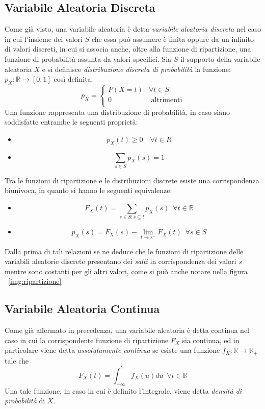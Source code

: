 \documentclass[a4paper,12pt, oneside]{book}
\newcommand{\numberset}{\mathbb}
\newcommand{\R}{\numberset{R}}
\begin{document}
\subsection{Variabile Aleatoria Discreta}
Come già visto, una variabile aleatoria è detta \emph{variabile aleatoria discreta} nel caso in cui l'insieme dei valori $S$
che essa può assumere  è finita oppure da un infinito di valori discreti, in cui si associa anche, oltre alla
funzione di ripartizione, una funzione di probabilità assunta da valori specifici.\newline
Sia $S$ il supporto della variabile aleatoria $X$ e si definisce \emph{distribuzione discreta di probabilità} la funzione:
$p_X:\R \to [0,1]$ così definita:
\[
    p_X = \begin{cases}
            P(X = t)& \forall t \in S\\
            0& \mbox{ altrimenti}\\
          \end{cases}\]
Una funzione rappresenta una distribuzione di probabilità, in caso siano soddisfatte entrambe le seguenti proprietà:
\begin{itemize}
    \item \[ p_X(t) \geq 0 \quad \forall t \in R \]
    \item \[ \sum _{s \in S} p_X(s) = 1 \]
\end{itemize}
Tra le funzioni di ripartizione e le distribuzioni discrete esiste una corrispondenza biunivoca, in quanto
si hanno le seguenti equivalenze:
\begin{itemize}
    \item \[F_X(t) = \sum _{s \in S:s \subseteq t} p_X(s)\,\,\, \forall t \in \R\]
    \item \[p_X(s) = F_X(s) - \lim _{t \to s^{-}} F_X(t)\,\,\, \forall s \in S\]
\end{itemize}
Dalla prima di tali relazioni se ne deduce che le funzioni di ripartizione delle variabili
aleatorie discrete presentano dei \textit{salti} in corrispondenza dei valori \textit{s} mentre
sono costanti per gli altri valori, come si può anche notare nella figura ~\ref{img:ripartizione}

\subsection{Variabile Aleatoria Continua}
Come già affermato in precedenza, una variabile aleatoria è detta continua nel caso in cui la 
corrispondente funzione di ripartizione $F_X$ sia continua, ed in particolare viene detta 
\emph{assolutamente continua} se esiste una funzione $f_X:\R \to \R_+$ tale che
\[F_X(t) = \int _{-\infty}^t f_X(u)du \,\,\, \forall t \in \R\]
Una tale funzione, in caso in cui è definito l'integrale, viene detta \emph{densità di probabilità }di $X$.
\end{document}
